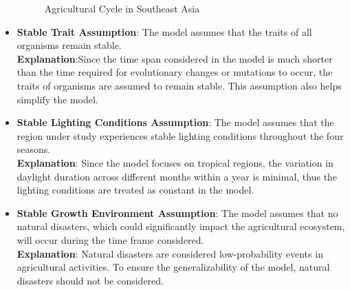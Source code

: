 \documentclass{HZNUMCM}
\begin{document}
\begin{itemize}
\begin{figure}[H]
          \caption{Agricultural Cycle in Southeast Asia\cite{IndoRice}}
          \label{fig:PlantMode}
        \end{figure}
        \item \textbf{Stable Trait Assumption}: The model assumes that the traits of all organisms remain stable.\\
        \textbf{Explanation}:Since the time span considered in the model is much shorter than the time required for evolutionary changes or mutations to occur,
         the traits of organisms are assumed to remain stable. This assumption also helps simplify the model.
        \item \textbf{Stable Lighting Conditions Assumption}: The model assumes that the region under study experiences stable lighting conditions throughout the four seasons.\\
        \textbf{Explanation}: Since the model focuses on tropical regions, the variation in daylight duration across different months within a year is minimal,
         thus the lighting conditions are treated as constant in the model.
        \item \textbf{Stable Growth Environment Assumption}: The model assumes that no natural disasters,
         which could significantly impact the agricultural ecosystem, will occur during the time frame considered.\\
        \textbf{Explanation}: Natural disasters are considered low-probability events in agricultural activities.
         To ensure the generalizability of the model, natural disasters should not be considered.
      \end{itemize}
\end{document}
